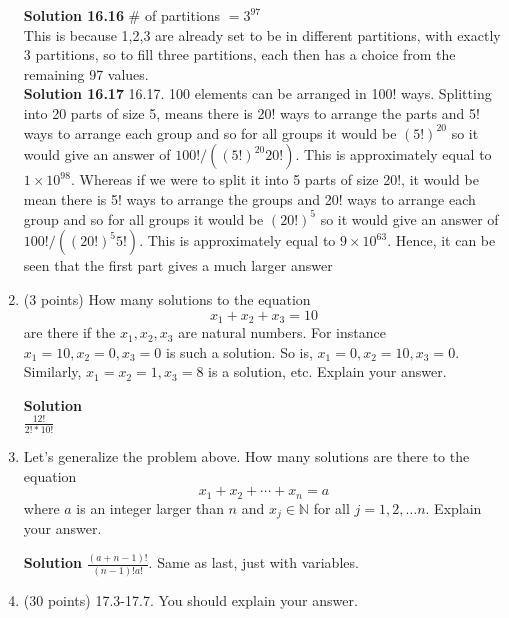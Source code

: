 \documentclass[12pt]{article}
\begin{document}
\begin{enumerate}
\textbf{Solution 16.16} \# of partitions $= 3^{97}$ \\
This is because 1,2,3 are already set to be in different partitions, with exactly 3 partitions, so to fill three partitions, each then has a choice from the remaining 97 values. \\

\textbf{Solution 16.17} 16.17. 100 elements can be arranged in 100! ways. Splitting into 20 parts of size 5, means there is 20! ways to arrange the parts and 5! ways to arrange each group and so for all groups it would be $(5!)^{20}$ so it would give an answer of $100!/((5!)^{20}20!)$. This is approximately equal to $1 \times 10^{98}$. Whereas if we were to split it into 5 parts of size 20!, it would be mean there is 5! ways to arrange the groups and 20! ways to arrange each group and so for all groups it would be $(20!)^{5}$ so it would give an answer of $100!/((20!)^{5}5!)$. This is approximately equal to $9 \times 10^{63}$. Hence, it can be seen that the first part gives a much larger answer\\



\item (3 points)  How many solutions to the equation 
\[
x_{1} + x_{2} + x_{3} = 10
\]
are there if the $x_{1}, x_{2}, x_{3}$ are natural numbers.  For instance $x_{1} = 10, x_{2} = 0, x_{3} = 0$ is such a solution.  So is, $x_{1} = 0, x_{2} = 10, x_{3} = 0$.  Similarly, $x_{1} = x_{2} = 1, x_{3} = 8$ is a solution, etc.  Explain your answer.  

\textbf{Solution}\\ $\frac{12!}{2!*10!}$ 


\item  Let's generalize the problem above.  How many solutions are there to the equation 
\[
x_{1} + x_{2} + \cdots + x_{n} = a
\]
where $a$ is an integer larger than $n$ and $x_{j} \in \mathbb{N}$ for all $j = 1, 2, \ldots n$.  Explain your answer. 

\textbf{Solution} $\frac{(a+n-1)!}{(n-1)!a!}$.  Same as last, just with variables. 


\item (30 points)  17.3-17.7.  You should explain your answer. 


\end{enumerate}
\end{document}
